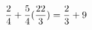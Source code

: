 \documentclass[preview]{standalone}
\begin{document}
\begin{align*}
\special{dvisvgm:raw <g id='unique000'>}\frac{2}{4} + \frac{5}{4} (\frac{22}{3}) = \frac{2}{3} + 9\special{dvisvgm:raw </g>}
\end{align*}
\end{document}
